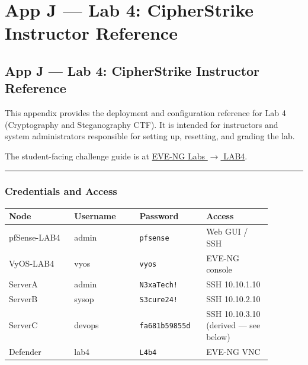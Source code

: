 \chapter{App J --- Lab 4: CipherStrike Instructor Reference}

\section{App J --- Lab 4: CipherStrike Instructor Reference}

This appendix provides the deployment and configuration reference for Lab 4 (Cryptography and Steganography CTF). It is intended for instructors and system administrators responsible for setting up, resetting, and grading the lab.

The student-facing challenge guide is at \href{../../labs/lab4/index.md}{EVE-NG Labs $\rightarrow$ LAB4}.

\begin{center}\rule{0.5\linewidth}{0.5pt}\end{center}

\subsection{Credentials and Access}

{\footnotesize\begin{longtable}[]{@{}
  >{\raggedright\arraybackslash}p{0.22\linewidth}
  >{\raggedright\arraybackslash}p{0.22\linewidth}
  >{\raggedright\arraybackslash}p{0.22\linewidth}
  >{\raggedright\arraybackslash}p{0.22\linewidth}@{}}
\toprule\noalign{}
\begin{minipage}[b]{\linewidth}\raggedright
Node
\end{minipage} & \begin{minipage}[b]{\linewidth}\raggedright
Username
\end{minipage} & \begin{minipage}[b]{\linewidth}\raggedright
Password
\end{minipage} & \begin{minipage}[b]{\linewidth}\raggedright
Access
\end{minipage} \\
\midrule\noalign{}
\endhead
\bottomrule\noalign{}
\endlastfoot
pfSense-LAB4 & admin & \texttt{pfsense} & Web GUI / SSH \\
VyOS-LAB4 & vyos & \texttt{vyos} & EVE-NG console \\
ServerA & admin & \texttt{N3xaTech!} & SSH 10.10.1.10 \\
ServerB & sysop & \texttt{S3cure24!} & SSH 10.10.2.10 \\
ServerC & devops & \texttt{fa681b59855d} & SSH 10.10.3.10 (derived --- see below) \\
Defender & lab4 & \texttt{L4b4} & EVE-NG VNC \\
\end{longtable}}

